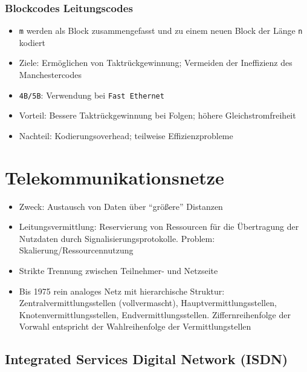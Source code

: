 \subsubsection{Blockcodes Leitungscodes}
\begin{itemize}
	\item \texttt{m} werden als Block zusammengefasst und zu einem neuen Block der Länge \texttt{n} kodiert
	\item Ziele: Ermöglichen von Taktrückgewinnung; Vermeiden der Ineffizienz des Manchestercodes
	\item \texttt{4B/5B}: Verwendung bei \texttt{Fast Ethernet}
	\item Vorteil: Bessere Taktrückgewinnung bei Folgen; höhere Gleichstromfreiheit
	\item Nachteil: Kodierungsoverhead; teilweise Effizienzprobleme
\end{itemize}



\section{Telekommunikationsnetze}
\begin{itemize}
	\item Zweck: Austausch von Daten über "`größere"' Distanzen
	\item Leitungsvermittlung: Reservierung von Ressourcen für die Übertragung der Nutzdaten durch Signalisierungsprotokolle. Problem: Skalierung/Ressourcennutzung
	\item Strikte Trennung zwischen Teilnehmer- und Netzseite
	\item Bis 1975 rein analoges Netz mit hierarchische Struktur: Zentralvermittlungsstellen (vollvermascht), Hauptvermittlungsstellen, Knotenvermittlungsstellen, Endvermittlungsstellen. Ziffernreihenfolge der Vorwahl entspricht der Wahlreihenfolge der Vermittlungstellen
\end{itemize}

\subsection{Integrated Services Digital Network (ISDN)}

